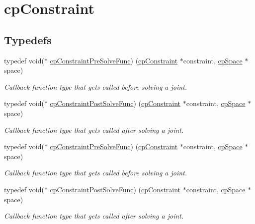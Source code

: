 \hypertarget{group__cpConstraint}{}\section{cp\+Constraint}
\label{group__cpConstraint}
\subsection*{Typedefs}
\begin{DoxyCompactItemize}
\item 
\mbox{\label{group__cpConstraint_gaf6038a155d58f45d6ab977dd1b1398de}} 
typedef void($\ast$ \hyperlink{group__cpConstraint_gaf6038a155d58f45d6ab977dd1b1398de}{cp\+Constraint\+Pre\+Solve\+Func}) (\hyperlink{structcpConstraint}{cp\+Constraint} $\ast$constraint, \hyperlink{structcpSpace}{cp\+Space} $\ast$space)
\begin{DoxyCompactList}\small\item\em Callback function type that gets called before solving a joint. \end{DoxyCompactList}\item 
\mbox{\label{group__cpConstraint_ga2208378297a7265d0cc69f31697961b9}} 
typedef void($\ast$ \hyperlink{group__cpConstraint_ga2208378297a7265d0cc69f31697961b9}{cp\+Constraint\+Post\+Solve\+Func}) (\hyperlink{structcpConstraint}{cp\+Constraint} $\ast$constraint, \hyperlink{structcpSpace}{cp\+Space} $\ast$space)
\begin{DoxyCompactList}\small\item\em Callback function type that gets called after solving a joint. \end{DoxyCompactList}\item 
\mbox{\label{group__cpConstraint_gaf6038a155d58f45d6ab977dd1b1398de}} 
typedef void($\ast$ \hyperlink{group__cpConstraint_gaf6038a155d58f45d6ab977dd1b1398de}{cp\+Constraint\+Pre\+Solve\+Func}) (\hyperlink{structcpConstraint}{cp\+Constraint} $\ast$constraint, \hyperlink{structcpSpace}{cp\+Space} $\ast$space)
\begin{DoxyCompactList}\small\item\em Callback function type that gets called before solving a joint. \end{DoxyCompactList}\item 
\mbox{\label{group__cpConstraint_ga2208378297a7265d0cc69f31697961b9}} 
typedef void($\ast$ \hyperlink{group__cpConstraint_ga2208378297a7265d0cc69f31697961b9}{cp\+Constraint\+Post\+Solve\+Func}) (\hyperlink{structcpConstraint}{cp\+Constraint} $\ast$constraint, \hyperlink{structcpSpace}{cp\+Space} $\ast$space)
\begin{DoxyCompactList}\small\item\em Callback function type that gets called after solving a joint. \end{DoxyCompactList}\end{DoxyCompactItemize}
